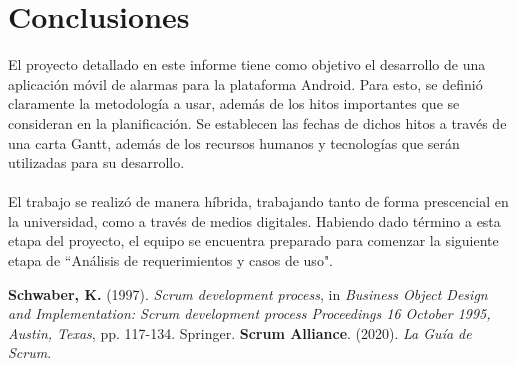 \documentclass[letterpaper, 10pt]{article}
\begin{document}
\section{Conclusiones}
El proyecto detallado en este informe tiene como objetivo el desarrollo de una aplicación móvil de alarmas para la plataforma Android. Para esto, se definió claramente la metodología a usar, además de los hitos importantes que se consideran en la planificación. Se establecen las fechas de dichos hitos a través de una carta Gantt, además de los recursos humanos y tecnologías que serán utilizadas para su desarrollo.
\\\\
El trabajo se realizó de manera híbrida, trabajando tanto de forma prescencial en la universidad, como a través de medios digitales. Habiendo dado término a esta etapa del proyecto, el equipo se encuentra preparado para comenzar la siguiente etapa de ``Análisis de requerimientos y casos de uso".

\clearpage
{}
\begin{thebibliography}{a}
     \textbf{Schwaber, K.} (1997). \textit{Scrum development process}, in \textit{Business Object Design and Implementation: Scrum development process Proceedings 16 October 1995, Austin, Texas}, pp. 117-134. Springer.
         \textbf{Scrum Alliance}. (2020). \textit{La Guía de Scrum}. 
\end{thebibliography}
\end{document}
